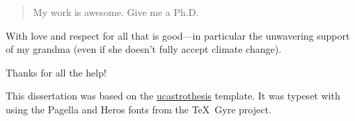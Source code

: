 \documentclass[12pt]{myucthesis}
\begin{document}
\ssp %
\hypersetup{pageanchor=false}

\maketitle
\copyrightpage

\begin{abstract}
My work is awesome. Give me a Ph.D.
\end{abstract}

\hypersetup{pageanchor=true}
\begin{frontmatter}

\begin{dedication}
\null\vfil
{\large
\begin{center}
With love and respect for all that is good—in particular the unwavering
support of my grandma (even if she doesn't fully accept climate change).
\end{center}}
\null\vfil
\end{dedication}

\tableofcontents
\listoffigures %
\listoftables %


\begin{acknowledgements}
Thanks for all the help!

This dissertation was based on the
\href{https://github.com/pkgw/ucastrothesis}{\textsf{ucastrothesis}}
template. It was typeset with  using the Pagella and Heros fonts
from the \TeX\ Gyre project.

\end{acknowledgements}
\end{frontmatter}

% 

% 
% 
% 

% 
% 

% 

\printbibliography[heading=bibintoc]

\appendix

% 
% 

% 
% 
% 
\end{document}

